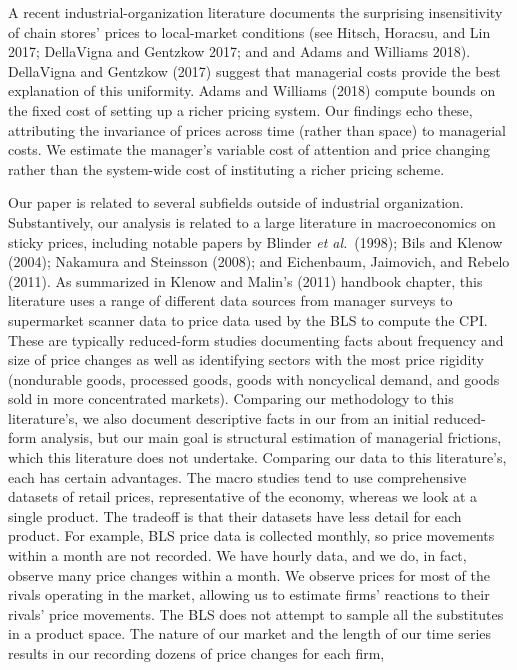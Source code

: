 \documentclass[11pt]{article}
\begin{document}
\begin{spacing}{1.3}
A recent industrial-organization literature documents the surprising insensitivity of chain stores' prices to local-market conditions (see Hitsch, Horacsu, and Lin 2017; DellaVigna and Gentzkow 2017; and and Adams and Williams 2018). 
DellaVigna and Gentzkow (2017) suggest that managerial costs provide the best explanation of this uniformity. Adams and Williams (2018) compute bounds on the fixed cost of setting up a richer pricing system. Our findings echo these, attributing the invariance of prices across time (rather than space) to managerial costs. We estimate the manager's variable cost of attention and price changing rather than the system-wide cost of instituting a richer pricing scheme. 

Our paper is related to several subfields outside of industrial
organization. Substantively, our analysis is related to a large
literature in macroeconomics on sticky prices, including notable
papers by Blinder {\em et al.}\ (1998); Bils and Klenow (2004);
Nakamura and Steinsson (2008); and Eichenbaum, Jaimovich, and Rebelo
(2011). As summarized in Klenow and Malin's (2011) handbook chapter,
this literature uses a range of different data sources from manager
surveys to supermarket scanner data to price data used by the BLS to
compute the CPI. These are typically reduced-form studies documenting
facts about frequency and size of price changes as well as identifying
sectors with the most price rigidity (nondurable goods, processed
goods, goods with noncyclical demand, and goods sold in more
concentrated markets).  Comparing our methodology to this
literature's, we also document descriptive facts in our from an
initial reduced-form analysis, but our main goal is structural
estimation of managerial frictions, which this literature does not
undertake.  Comparing our data to this literature's, each has certain
advantages.  The macro studies tend to use comprehensive datasets of
retail prices, representative of the economy, whereas we look at a
single product. The tradeoff is that their datasets have less detail
for each product. For example, BLS price data is collected monthly, so
price movements within a month are not recorded. We have hourly data,
and we do, in fact, observe many price changes within a month. We
observe prices for most of the rivals operating in the market,
allowing us to estimate firms' reactions to their rivals' price
movements.  The BLS does not attempt to sample all the substitutes in
a product space. The nature of our market and the length of our time
series results in our recording dozens of price changes for each firm,

\end{spacing}
\end{document}
